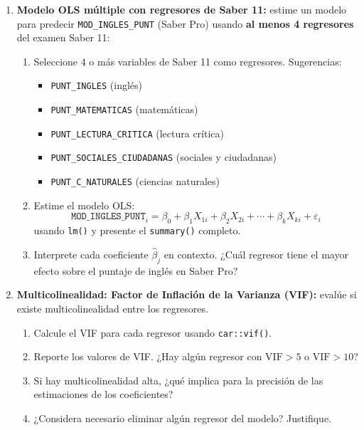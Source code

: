 \documentclass[11pt, a4paper]{article}
\begin{document}
\begin{enumerate}[label=\arabic*)]
  \item \textbf{Modelo OLS m\'ultiple con regresores de Saber 11:} estime un
        modelo para predecir \texttt{MOD\_INGLES\_PUNT} (Saber Pro) usando
        \textbf{al menos 4 regresores} del examen Saber 11:
        \begin{enumerate}[label=\alph*)]
          \item Seleccione 4 o m\'as variables de Saber 11 como regresores.
                Sugerencias:
                \begin{itemize}
                  \item \texttt{PUNT\_INGLES} (ingl\'es)
                  \item \texttt{PUNT\_MATEMATICAS} (matem\'aticas)
                  \item \texttt{PUNT\_LECTURA\_CRITICA} (lectura cr\'itica)
                  \item \texttt{PUNT\_SOCIALES\_CIUDADANAS} (sociales y
                        ciudadanas)
                  \item \texttt{PUNT\_C\_NATURALES} (ciencias naturales)
                \end{itemize}
          \item Estime el modelo OLS:
                \[
                  \texttt{MOD\_INGLES\_PUNT}_i = \beta_0 + \beta_1 X_{1i} +
                  \beta_2 X_{2i} + \cdots + \beta_k X_{ki} + \varepsilon_i
                \]
                usando \texttt{lm()} y presente el \texttt{summary()} completo.
          \item Interprete cada coeficiente $\hat{\beta}_j$ en contexto.
                ¿Cu\'al regresor tiene el mayor efecto sobre el puntaje de
                ingl\'es en Saber Pro?
        \end{enumerate}

  \item \textbf{Multicolinealidad: Factor de Inflaci\'on de la Varianza (VIF):}
        eval\'ue si existe multicolinealidad entre los regresores.
        \begin{enumerate}[label=\alph*)]
          \item Calcule el VIF para cada regresor usando \texttt{car::vif()}.
          \item Reporte los valores de VIF. ¿Hay alg\'un regresor con
                $\text{VIF} > 5$ o $\text{VIF} > 10$?
          \item Si hay multicolinealidad alta, ¿qu\'e implica para la
                precisi\'on de las estimaciones de los coeficientes?
          \item ¿Considera necesario eliminar alg\'un regresor del modelo?
                Justifique.
        \end{enumerate}


\end{enumerate}
\end{document}
